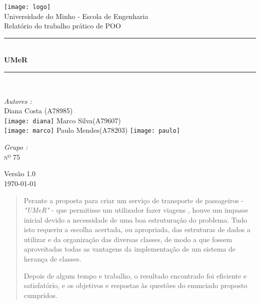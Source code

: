 \documentclass[a4paper]{article}
\begin{document}
\begin{titlepage}
\begin{center}

\texttt{[image: logo]}\\[1cm]

{\large Universidade do Minho - Escola de Engenharia}\\[0.5cm]

{\large Relatório do trabalho prático de POO}\\[0.5cm]

\rule{\linewidth}{0.5mm} \\[0.4cm]
{ \huge \bfseries UMeR \\[0.4cm] }
\rule{\linewidth}{0.5mm} \\[1.5cm]

\noindent
\begin{minipage}{0.4\textwidth}
  \begin{flushleft} \large
    \emph{Autores :}\\
    Diana Costa \textsc{(A78985)}\\
    \texttt{[image: diana]}\break
    Marco Silva\textsc{(A79607)}\\
    \texttt{[image: marco]}\break
    Paulo Mendes\textsc{(A78203)}
    \texttt{[image: paulo]}\break
  \end{flushleft}
\end{minipage}%
\begin{minipage}{0.4\textwidth}
  \begin{flushright} \large
    \emph{Grupo :} \\
    \textsc{nº 75}
  \end{flushright}
\end{minipage}

\vfill

{\large Versão 1.0 \\ \today}

\end{center}
\end{titlepage}




\pagebreak
\begin{abstract}

\hspace{3mm} Perante a proposta para criar um serviço de transporte de passageiros - \emph{"UMeR"} - que permitisse um utilizador fazer viagens , houve um impasse inicial devido a necessidade de uma boa estruturação do problema. Tudo isto requeriu a escolha acertada, ou apropriada, das estruturas de dados a utilizar e da organização das diversas classes, de modo a que fossem aproveitadas todas as vantagens da implementação de um sistema de herança de classes.

Depois de algum tempo e trabalho, o resultado encontrado foi eficiente e satisfatório, e os objetivos e respostas às questões do enunciado proposto cumpridos.

\end{abstract}
\end{document}
